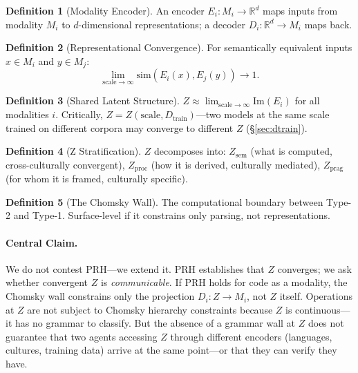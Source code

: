 \documentclass[11pt]{article}
\theoremstyle{definition}
\newtheorem{definition}{Definition}[section]
\newcommand{\Zsem}{Z_{\text{sem}}}
\newcommand{\Zproc}{Z_{\text{proc}}}
\newcommand{\Zprag}{Z_{\text{prag}}}
\newcommand{\Dtrain}{D_{\text{train}}}
\begin{document}
\begin{definition}[Modality Encoder]\label{def:encoder}
An encoder $E_i : M_i \to \mathbb{R}^d$ maps inputs from modality $M_i$ to $d$-dimensional representations; a decoder $D_i : \mathbb{R}^d \to M_i$ maps back.
\end{definition}

\begin{definition}[Representational Convergence]\label{def:convergence}
For semantically equivalent inputs $x \in M_i$ and $y \in M_j$:
\[
\lim_{\text{scale}\to\infty} \mathrm{sim}(E_i(x), E_j(y)) \to 1.
\]
\end{definition}

\begin{definition}[Shared Latent Structure]\label{def:Z}
$Z \approx \lim_{\text{scale}\to\infty} \mathrm{Im}(E_i)$ for all modalities $i$. Critically, $Z = Z(\text{scale}, \Dtrain)$---two models at the same scale trained on different corpora may converge to different $Z$ (\S\ref{sec:dtrain}).
\end{definition}

\begin{definition}[Z Stratification]\label{def:stratification}
$Z$ decomposes into: $\Zsem$ (what is computed, cross-culturally convergent), $\Zproc$ (how it is derived, culturally mediated), $\Zprag$ (for whom it is framed, culturally specific).
\end{definition}

\begin{definition}[The Chomsky Wall]\label{def:wall}
The computational boundary between Type-2 and Type-1. Surface-level if it constrains only parsing, not representations.
\end{definition}

\paragraph{Central Claim.}
We do not contest PRH---we extend it. PRH establishes that $Z$ converges; we ask whether convergent $Z$ is \emph{communicable}. If PRH holds for code as a modality, the Chomsky wall constrains only the projection $D_i : Z \to M_i$, not $Z$ itself. Operations at $Z$ are not subject to Chomsky hierarchy constraints because $Z$ is continuous---it has no grammar to classify. But the absence of a grammar wall at $Z$ does not guarantee that two agents accessing $Z$ through different encoders (languages, cultures, training data) arrive at the same point---or that they can verify they have.
\end{document}
